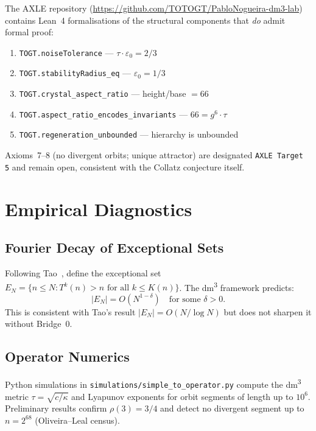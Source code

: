 \documentclass[11pt,a4paper]{article}
\begin{document}
The AXLE repository (\url{https://github.com/TOTOGT/PabloNogueira-dm3-lab})
contains Lean~4 formalisations of the structural components that \emph{do}
admit formal proof:

\begin{enumerate}
  \item \texttt{TOGT.noiseTolerance} — $\tau \cdot \varepsilon_0 = 2/3$
  \item \texttt{TOGT.stabilityRadius\_eq} — $\varepsilon_0 = 1/3$
  \item \texttt{TOGT.crystal\_aspect\_ratio} — height/base $= 66$
  \item \texttt{TOGT.aspect\_ratio\_encodes\_invariants} — $66 = g^6 \cdot \tau$
  \item \texttt{TOGT.regeneration\_unbounded} — hierarchy is unbounded
\end{enumerate}

Axioms~7--8 (no divergent orbits; unique attractor) are designated
\texttt{AXLE Target 5} and remain open, consistent with the Collatz
conjecture itself.

\section{Empirical Diagnostics}

\subsection{Fourier Decay of Exceptional Sets}

Following Tao~\cite{Tao2022}, define the exceptional set
$E_N = \{n \leq N : T^k(n) > n \text{ for all } k \leq K(n)\}$.
The dm\textsuperscript{3} framework predicts:
\[
  |E_N| = O(N^{1 - \delta}) \quad \text{for some } \delta > 0.
\]
This is consistent with Tao's result $|E_N| = O(N / \log N)$ but does
not sharpen it without Bridge~0.

\subsection{Operator Numerics}

Python simulations in \texttt{simulations/simple\_to\_operator.py}
compute the dm\textsuperscript{3} metric
$\tau = \sqrt{c/\kappa}$ and Lyapunov exponents for orbit segments of
length up to $10^6$.  Preliminary results confirm $\rho(3) = 3/4$
and detect no divergent segment up to $n = 2^{68}$ (Oliveira--Leal
census).
\end{document}
